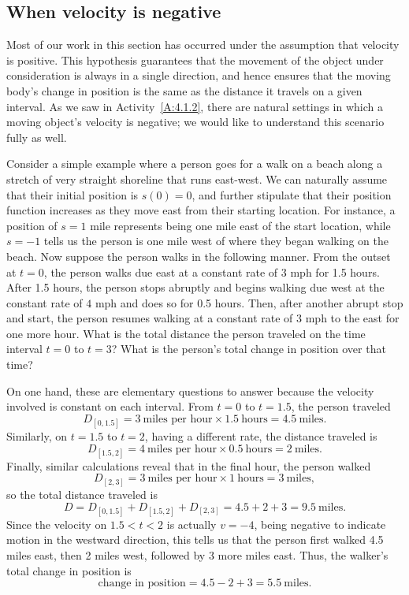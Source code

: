 \subsection*{When velocity is negative}

Most of our work in this section has occurred under the assumption that velocity is positive.  This hypothesis guarantees that the movement of the object under consideration is always in a single direction, and hence ensures that the moving body's change in position is the same as the distance it travels on a given interval.  As we saw in Activity~\ref{A:4.1.2}, there are natural settings in which a moving object's velocity is negative; we would like to understand this scenario fully as well.

Consider a simple example where a person goes for a walk on a beach along a stretch of very straight shoreline that runs east-west.  We can naturally assume that their initial position is $s(0) = 0$, and further stipulate that their position function increases as they move east from their starting location.  For instance, a position of $s = 1$ mile represents being one mile east of the start location, while $s = -1$ tells us the person is one mile west of where they began walking on the beach.  Now suppose the person walks in the following manner.  From the outset at $t = 0$, the person walks due east at a constant rate of $3$ mph for 1.5 hours.  After 1.5 hours, the person stops abruptly and begins walking due west at the constant rate of $4$ mph and does so for 0.5 hours.  Then, after another abrupt stop and start, the person resumes walking at a constant rate of $3$ mph to the east for one more hour.  What is the total distance the person traveled on the time interval $t = 0$ to $t = 3$?  What is the person's total change in position over that time?

On one hand, these are elementary questions to answer because the velocity involved is constant on each interval.  From $t = 0$ to $t = 1.5$, the person traveled 
\[ D_{[0,1.5]} = 3 \ \mbox{miles per hour} \times 1.5 \ \mbox{hours} = 4.5 \ \mbox{miles}.\]
Similarly, on $t = 1.5$ to $t = 2$, having a different rate, the distance traveled is
\[D_{[1.5,2]} = 4 \ \mbox{miles per hour} \times 0.5 \ \mbox{hours} = 2 \ \mbox{miles}.\]
Finally, similar calculations reveal that in the final hour, the person walked
\[D_{[2,3]} = 3 \ \mbox{miles per hour} \times 1 \ \mbox{hours} = 3 \ \mbox{miles},\]
so the total distance traveled is
\[D = D_{[0,1.5]} + D_{[1.5,2]} + D_{[2,3]} = 4.5 + 2 + 3 = 9.5 \ \mbox{miles}.\]
Since the velocity on $1.5 < t < 2$ is actually $v = -4$, being negative to indicate motion in the westward direction, this tells us that the person first walked 4.5 miles east, then 2 miles west, followed by 3 more miles east.  Thus, the walker's total change in position is
\[\mbox{change in position} = 4.5 - 2 + 3 = 5.5 \ \mbox{miles}.\]

